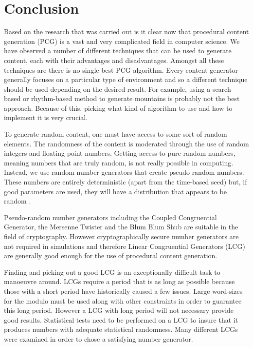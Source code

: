 \chapter{Conclusion}

Based on the research that was carried out is it clear now that procedural content generation (PCG) is a vast and very complicated field in computer science. We have observed a number of different techniques that can be used to generate content, each with their advantages and disadvantages. Amongst all these techniques are there is no single best PCG algorithm. Every content generator generally focuses on a particular type of environment and so a different technique should be used depending on the desired result. For example, using a search-based or rhythm-based method to generate mountains is probably not the best approach. Because of this, picking what kind of algorithm to use and how to implement it is very crucial.

To generate random content, one must have access to some sort of random elements. The randomness of the content is moderated through the use of random integers and floating-point numbers. Getting access to pure random numbers, meaning numbers that are truly random, is not really possible in computing. Instead, we use random number generators that create pseudo-random numbers. These numbers are entirely deterministic (apart from the time-based seed) but, if good parameters are used, they will have a distribution that appears to be random \citep{yu_random}.

Pseudo-random number generators including the Coupled Congruential Generator, the Mersenne Twister and the Blum Blum Shub are suitable in the field of cryptography. However cryptographically secure number generators are not required in simulations and therefore Linear Congruential Generators (LCG) are generally good enough for the use of procedural content generation. 

Finding and picking out a good LCG is an exceptionally difficult task to manoeuvre around. LCGs require a period that is as long as possible because those with a short period have historically caused a few issues. Large word-sizes for the modulo must be used along with other constraints in order to guarantee this long period. However a LCG with long period will not necessary provide good results. Statistical tests need to be performed on a LCG to insure that it produces numbers with adequate statistical randomness. Many different LCGs were examined in order to chose a satisfying number generator.

